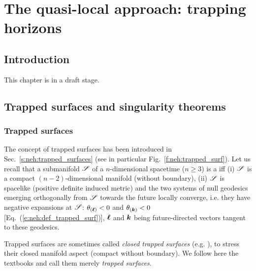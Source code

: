 \chapter{The quasi-local approach: trapping horizons}
\label{s:loc}

\minitoc

\section{Introduction}

This chapter is in a draft stage.

\section{Trapped surfaces and singularity theorems}

\subsection{Trapped surfaces}

The concept of trapped surfaces has been introduced in Sec.~\ref{s:neh:trapped_surfaces}
(see in particular Fig.~\ref{f:neh:trapped_surf}). Let us recall that
a submanifold $\mathscr{S}$ of a $n$-dimensional spacetime ($n\ge 3$) is
a  iff (i) $\mathscr{S}$ is a compact $(n-2)$-dimensional manifold
(without boundary), (ii) $\mathscr{S}$ is spacelike (positive definite induced metric)
and the two systems of null geodesics emerging orthogonally from $\mathscr{S}$ towards the future
locally converge, i.e. they have negative expansions at $\mathscr{S}$:
$\theta_{(\bm{\ell})} < 0$ and $\theta_{(\bm{k})} < 0$ [Eq.~(\ref{e:neh:def_trapped_surf})],
$\bm{\ell}$ and $\bm{k}$ being
future-directed vectors tangent to these geodesics.

\begin{remark}
Trapped surfaces are sometimes called
\emph{closed trapped surfaces} (e.g. \cite{Penro65,HawkiE73}),
to stress their closed manifold aspect (compact without boundary).
We follow here the textbooks \cite{MisneTW73,Wald84} and call them merely
\emph{trapped surfaces}.
\end{remark}

